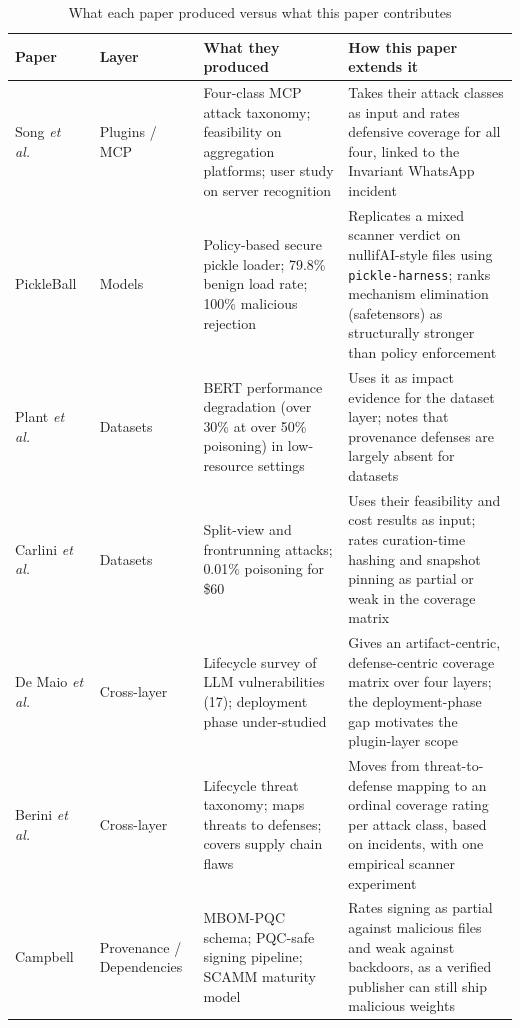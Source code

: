 \documentclass[conference]{IEEEtran}
\begin{document}
\begin{table}[!t]
\caption{What each paper produced versus what this paper contributes}
\label{tab:litcompare}
\centering
\footnotesize
\renewcommand{\arraystretch}{1.25}
\begin{tabular}{L{2.2cm}L{2.0cm}L{3.3cm}L{5.5cm}}
\hline\hline
\textbf{Paper} & \textbf{Layer} & \textbf{What they produced} & \textbf{How this paper extends it}\\
\hline
Song \textit{et al.}~\cite{song2025} & Plugins / MCP & Four-class MCP attack taxonomy; feasibility on aggregation platforms; user study on server recognition & Takes their attack classes as input and rates defensive coverage for all four, linked to the Invariant WhatsApp incident\\
PickleBall~\cite{pickleball2025} & Models & Policy-based secure pickle loader; 79.8\% benign load rate; 100\% malicious rejection & Replicates a mixed scanner verdict on nullifAI-style files using \texttt{pickle-harness}; ranks mechanism elimination (safetensors) as structurally stronger than policy enforcement\\
Plant \textit{et al.}~\cite{plant2025} & Datasets & BERT performance degradation (over 30\% at over 50\% poisoning) in low-resource settings & Uses it as impact evidence for the dataset layer; notes that provenance defenses are largely absent for datasets\\
Carlini \textit{et al.}~\cite{carlini2024} & Datasets & Split-view and frontrunning attacks; 0.01\% poisoning for \$60 & Uses their feasibility and cost results as input; rates curation-time hashing and snapshot pinning as partial or weak in the coverage matrix\\
De Maio \textit{et al.}~\cite{demaio2025} & Cross-layer & Lifecycle survey of LLM vulnerabilities (17); deployment phase under-studied & Gives an artifact-centric, defense-centric coverage matrix over four layers; the deployment-phase gap motivates the plugin-layer scope\\
Berini \textit{et al.}~\cite{berini2026} & Cross-layer & Lifecycle threat taxonomy; maps threats to defenses; covers supply chain flaws & Moves from threat-to-defense mapping to an ordinal coverage rating per attack class, based on incidents, with one empirical scanner experiment\\
Campbell~\cite{campbell2026} & Provenance / Dependencies & MBOM-PQC schema; PQC-safe signing pipeline; SCAMM maturity model & Rates signing as partial against malicious files and weak against backdoors, as a verified publisher can still ship malicious weights\\
\hline
\end{tabular}
\end{table}
\end{document}
